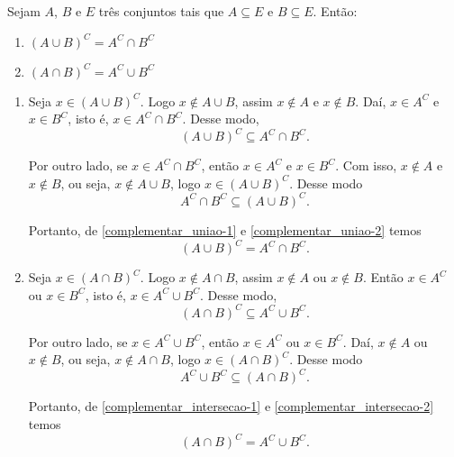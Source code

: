\begin{proposicao} Sejam $A$, $B$ e $E$ três conjuntos tais que $A\subseteq E$ e $B\subseteq E$. Então:
\begin{enumerate}[label={\roman*})]
    \item $(A\cup B)^C = A^C\cap B^C$
    \item $(A\cap B)^C = A^C\cup B^C$
\end{enumerate}
\end{proposicao}
\begin{prova}
    \begin{enumerate}[label={\roman*})]
        \item Seja $x \in (A\cup B)^C$. Logo $x\notin A\cup B$, assim $x\notin A$ e $x\notin B$. Daí, $x\in A^C$ e $x\in B^C$, isto é, $x\in A^C\cap B^C$. Desse modo,
        \begin{equation}\label{complementar_uniao-1}
            (A\cup B)^C \subseteq A^C\cap B^C.
        \end{equation}

        Por outro lado, se $x\in A^C\cap B^C$, então $x\in A^C$ e $x\in B^C$. Com isso, $x\notin A$ e $x\notin B$, ou seja, $x\notin A\cup B$, logo $x\in (A\cup B)^C$. Desse modo
        \begin{equation}\label{complementar_uniao-2}
            A^C\cap B^C\subseteq(A\cup B)^C.
        \end{equation}

        Portanto, de \eqref{complementar_uniao-1} e \eqref{complementar_uniao-2} temos
        \[
            (A\cup B)^C = A^C\cap B^C.
        \]

        \item Seja $x \in (A\cap B)^C$. Logo $x\notin A\cap B$, assim $x\notin A$ ou $x\notin B$. Então $x\in A^C$ ou $x\in B^C$, isto é, $x\in A^C\cup B^C$. Desse modo,
        \begin{equation}\label{complementar_intersecao-1}
            (A\cap B)^C \subseteq A^C\cup B^C.
        \end{equation}

        Por outro lado, se $x\in A^C\cup B^C$, então $x\in A^C$ ou $x\in B^C$. Daí, $x\notin A$ ou $x\notin B$, ou seja, $x\notin A\cap B$, logo $x\in (A\cap B)^C$. Desse modo
        \begin{equation}\label{complementar_intersecao-2}
            A^C\cup B^C\subseteq(A\cap B)^C.
        \end{equation}

        Portanto, de \eqref{complementar_intersecao-1} e \eqref{complementar_intersecao-2} temos
        \[
            (A\cap B)^C = A^C\cup B^C.
        \]
    \end{enumerate}
\end{prova}

